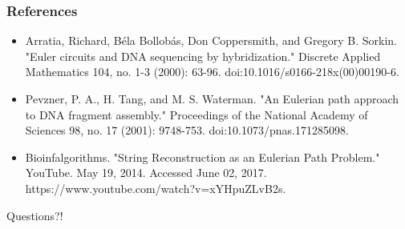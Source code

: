 \documentclass{beamer}
\begin{document}
\begin{frame}
\frametitle{References}
\begin{itemize}
\item Arratia, Richard, Béla Bollobás, Don Coppersmith, and Gregory B. Sorkin. "Euler circuits and DNA sequencing by hybridization." Discrete Applied Mathematics 104, no. 1-3 (2000): 63-96. doi:10.1016/s0166-218x(00)00190-6.
\item Pevzner, P. A., H. Tang, and M. S. Waterman. "An Eulerian path approach to DNA fragment assembly." Proceedings of the National Academy of Sciences 98, no. 17 (2001): 9748-753. doi:10.1073/pnas.171285098.
\item Bioinfalgorithms. "String Reconstruction as an Eulerian Path Problem." YouTube. May 19, 2014. Accessed June 02, 2017. https://www.youtube.com/watch?v=xYHpuZLvB2s.
\end{itemize}
\end{frame}


\begin{frame}
\Huge{\centerline{Questions?!}}
\end{frame}

\end{document}
